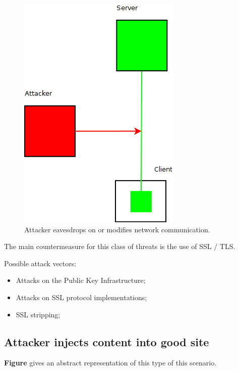 \begin{figure}
	\begin{center}		
		\includegraphics[width=0.6\columnwidth]{img/security/threat-scenario-evesdropping}
		\caption{Attacker eavesdrops on or modifies network communication.}
		\label{fig:threat-scenario:evesdropping}
	\end{center}
\end{figure}

The main countermeasure for this class of threats is the use of SSL / TLS.

Possible attack vectors:
\begin{itemize}
	\item Attacks on the Public Key Infrastructure;
	\item Attacks on SSL protocol implementations;
	\item SSL stripping;
\end{itemize}


\subsection{Attacker injects content into good site}

\textbf{Figure} gives an abstract representation of this type of this scenario.

